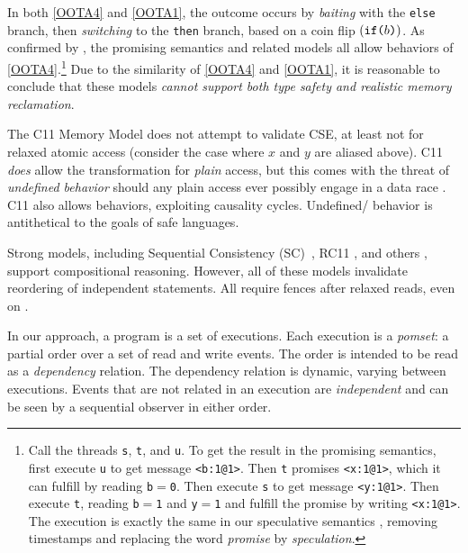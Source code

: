 In both \ref{OOTA4} and \ref{OOTA1}, the \oota{} outcome occurs by
\emph{baiting} with the \texttt{else} branch, then \emph{switching} to the
\texttt{then} branch, based on a coin flip $(\texttt{if}\allowbreak\texttt{(}b\texttt{)})$.  As confirmed by
\cite{kang,soham}, the promising semantics \cite{DBLP:conf/popl/KangHLVD17}
and related models
\citep{DBLP:conf/esop/JagadeesanPR10,DBLP:journals/pacmpl/ChakrabortyV19,Manson:2005:JMM:1047659.1040336}
all allow \oota{} behaviors of \ref{OOTA4}.\footnote{Call the threads
  \texttt{s}, \texttt{t}, and \texttt{u}.  To get the result in the promising
  semantics, first execute \texttt{u} to get message \texttt{<b:1@1>}.  Then
  \texttt{t} promises \texttt{<x:1@1>}, which it can fulfill by reading
  \texttt{b}$=$\texttt{0}.  Then execute \texttt{s} to get message \texttt{<y:1@1>}.
  Then execute \texttt{t}, reading \texttt{b}$=$\texttt{1} and \texttt{y}$=$\texttt{1} and
  fulfill the promise by writing \texttt{<x:1@1>}. The execution is exactly
  the same in our speculative semantics \cite{DBLP:conf/esop/JagadeesanPR10},
  removing timestamps and replacing the word \emph{promise} by \emph{speculation}.}  Due
to the similarity of \ref{OOTA4} and \ref{OOTA1}, it is reasonable to
conclude that these models \emph{cannot support both type safety and
  realistic memory reclamation}.

The C11 Memory Model \cite{Batty:2011:MCC:1926385.1926394} does not attempt
to validate CSE, at least not for relaxed atomic access (consider the case
where $x$ and $y$ are aliased above).  C11 \emph{does} allow the
transformation for \emph{plain} access, but this comes with the threat of
\emph{undefined behavior} should any plain access ever possibly engage in a
data race \cite{undefined}.  C11 also allows \oota{} behaviors, exploiting
causality cycles.  Undefined/\oota{} behavior is antithetical to the goals of
safe languages.

Strong models, including Sequential Consistency
(SC)~\citep{Lamport:1979:MMC:1311099.1311750}, RC11
\citep{DBLP:conf/pldi/LahavVKHD17}, and others
\citep{Dolan:2018:BDR:3192366.3192421,DBLP:conf/pldi/LahavVKHD17,DBLP:conf/lics/JeffreyR16,Boehm:2014:OGA:2618128.2618134},
support compositional reasoning.  However, all of these models invalidate
reordering of independent statements.  All require fences after relaxed
reads, even on \armeight.


In our approach, a program is a set of executions.  Each execution is a
\emph{pomset}: a partial order over a set of read and write events.  The
order is intended to be read as a \emph{dependency} relation.  The dependency
relation is dynamic, varying between executions.  Events that are not related
in an execution are \emph{independent} and can be seen by a sequential
observer in either order.

